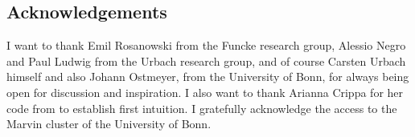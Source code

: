 \begin{strip}
\section{Acknowledgements}
I want to thank Emil Rosanowski from the Funcke research group, Alessio Negro and Paul Ludwig from the Urbach research group, and of course Carsten Urbach himself and also Johann Ostmeyer, from the University of Bonn, for always being open for discussion and inspiration. I also want to thank Arianna Crippa for her code from \cite{crippa2024} to establish first intuition. 
I gratefully acknowledge the access to the Marvin cluster of the University of Bonn.
\end{strip}
